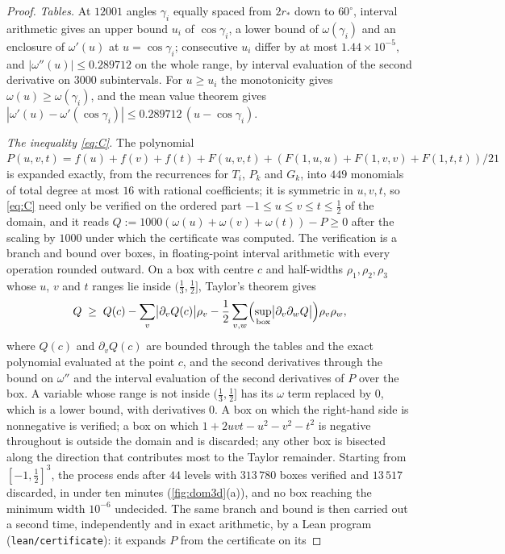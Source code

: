 \documentclass[11pt,reqno]{amsart}
\renewcommand{\_}{\origunderscore\allowbreak}
\numberwithin{equation}{section}
\theoremstyle{plain}
\theoremstyle{definition}
\theoremstyle{remark}
\begin{document}
\begin{proof}
\emph{Tables.} At $12001$ angles $\gamma_i$ equally spaced from $2r_*$ down
to $60^\circ$, interval arithmetic gives an upper bound $u_i$ of
$\cos\gamma_i$, a lower bound of $\omega(\gamma_i)$ and an enclosure of
$\omega'(u)$ at $u=\cos\gamma_i$; consecutive $u_i$ differ by at most
$1.44\times10^{-5}$, and $|\omega''(u)|\le0.289712$ on the whole range,
by interval evaluation of the second derivative on $3000$ subintervals.
For $u\ge u_i$ the monotonicity gives $\omega(u)\ge\omega(\gamma_i)$, and
the mean value theorem gives $|\omega'(u)-\omega'(\cos\gamma_i)|\le0.289712\,(u-\cos\gamma_i)$.

\emph{The inequality \eqref{eq:C}.} The polynomial
$P(u,v,t)=f(u)+f(v)+f(t)+F(u,v,t)+(F(1,u,u)+F(1,v,v)+F(1,t,t))/21$ is
expanded exactly, from the recurrences for $T_i$, $P_k$ and $G_k$, into
$449$ monomials of total degree at most $16$ with rational coefficients;
it is symmetric in $u,v,t$, so \eqref{eq:C} need only be verified on
the ordered part $-1\le u\le v\le t\le\tfrac12$ of the domain, and it
reads $Q:=1000(\omega(u)+\omega(v)+\omega(t))-P\ge0$ after the scaling
by $1000$ under which the certificate was computed. The verification is
a branch and bound over boxes, in floating-point interval arithmetic
with every operation rounded outward. On a box with centre $c$ and
half-widths $\rho_1,\rho_2,\rho_3$ whose $u$, $v$ and $t$ ranges lie
inside $(\tfrac13,\tfrac12]$, Taylor's theorem gives
\[
  Q\;\ge\;Q(c)-\sum_v\bigl|\partial_vQ(c)\bigr|\rho_v
  -\frac12\sum_{v,w}\Bigl(\sup_{\rm box}\bigl|\partial_v\partial_wQ\bigr|\Bigr)\rho_v\rho_w ,
\]
where $Q(c)$ and $\partial_vQ(c)$ are bounded through the tables and the
exact polynomial evaluated at the point $c$, and the second derivatives
through the bound on $\omega''$ and the interval evaluation of the
second derivatives of $P$ over the box. A variable whose range is not
inside $(\tfrac13,\tfrac12]$ has its $\omega$ term replaced by $0$, which
is a lower bound, with derivatives $0$. A box on which the right-hand
side is nonnegative is verified; a box on which $1+2uvt-u^2-v^2-t^2$ is
negative throughout is outside the domain and is discarded; any other
box is bisected along the direction that contributes most to the
Taylor remainder. Starting from $[-1,\tfrac12]^3$, the process ends
after $44$ levels with $313\,780$ boxes verified and $13\,517$
discarded, in under ten minutes (\cref{fig:dom3d}(a)), and no box reaching the minimum width
$10^{-6}$ undecided. The same branch and bound is then carried out a
second time, independently and in exact arithmetic, by a Lean program
(\texttt{lean/certificate}): it expands $P$ from the certificate on its

\end{proof}
\end{document}
